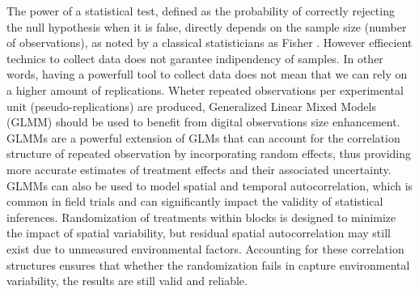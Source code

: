 \documentclass[12pt,a4paper,oneside]{report}
\begin{document}
The power of a statistical test, defined as the probability of correctly
rejecting the null hypothesis when it is false, directly depends on the sample
size (number of observations), as noted by a classical statisticians as
Fisher \cite{fisherStatisticalMethodsResearch1992}. However effiecient technics
to collect data does not garantee indipendency of samples. 
In other words, having a powerfull tool to collect data does not mean that we
can rely on a higher amount of replications.
Wheter repeated observations
per experimental unit (pseudo-replications) are produced, Generalized Linear Mixed Models 
(GLMM) \cite{gburAnalysisGeneralizedLinear2020,kumleEstimatingPowerGeneralized2021}
should be used to benefit from 
digital observations size enhancement. GLMMs are a powerful extension of GLMs that can
account for the correlation structure of repeated observation
by incorporating random effects, thus providing more
accurate estimates of treatment effects and their associated uncertainty.
GLMMs can also be used to model spatial and temporal autocorrelation, which is
common in field trials and can significantly impact the validity of statistical
inferences. Randomization of treatments within blocks is designed to minimize
the impact of spatial variability, but residual spatial autocorrelation may still
exist due to unmeasured environmental factors. Accounting for these correlation
structures ensures that whether the randomization fails in capture environmental
variability, the results are still valid and reliable.
\end{document}
